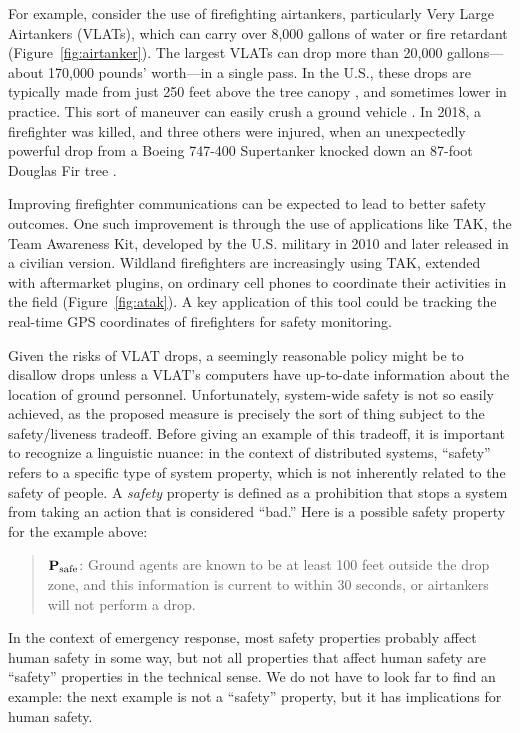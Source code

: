 \documentclass[]             %
{NASA}                       %
\theoremstyle{definition}
\begin{document}
For example, consider the use of firefighting airtankers, particularly
Very Large Airtankers (VLATs), which can carry over 8,000 gallons of
water or fire retardant \cite{2019:airtankerops}
(Figure~\ref{fig:airtanker}). The largest VLATs can drop more than
20,000 gallons---about 170,000 pounds' worth---in a single pass. In
the U.S., these drops are typically made from just 250 feet above the
tree canopy \cite{2019:airtankerops}, and sometimes lower in
practice. This sort of maneuver can easily crush a ground vehicle
\cite{2019:stickney}. In 2018, a firefighter was killed, and three
others were injured, when an unexpectedly powerful drop from a Boeing
747-400 Supertanker knocked down an 87-foot Douglas Fir tree
\cite{2018:calfire}.

Improving firefighter communications can be expected to lead to better
safety outcomes. One such improvement is through the use of
applications like TAK, the Team Awareness Kit, developed by the
U.S. military in 2010 and later released in a civilian
version. Wildland firefighters are increasingly using TAK, extended
with aftermarket plugins, on ordinary cell phones to coordinate their
activities in the field (Figure~\ref{fig:atak}). A key application of
this tool could be tracking the real-time GPS coordinates of
firefighters for safety monitoring.

Given the risks of VLAT drops, a seemingly reasonable policy
might be to disallow drops unless a VLAT's computers have up-to-date
information about the location of ground personnel. Unfortunately,
system-wide safety is not so easily achieved, as the proposed measure
is precisely the sort of thing subject to the safety/liveness
tradeoff. Before giving an example of this tradeoff, it is important to recognize a linguistic nuance: in
the context of distributed systems, ``safety'' refers to a specific
type of system property, which is not inherently related to the safety of people. A \emph{safety} property is defined as a prohibition that stops
a system from taking an action that is considered ``bad.'' Here
is a possible safety property for the example above:
\begin{quote}
  $\textbf{P}_\textrm{safe}$: Ground agents are known to be at least
  100 feet outside the drop zone, and this information is current to
  within 30 seconds, or airtankers will not perform a drop.
\end{quote}
In the context of emergency response, most safety properties probably affect human safety in some way, but not all properties that affect human safety are ``safety'' properties in the technical sense. We do not have to look far to find an example: the next example is not a ``safety'' property, but it has implications for human safety.
\end{document}
